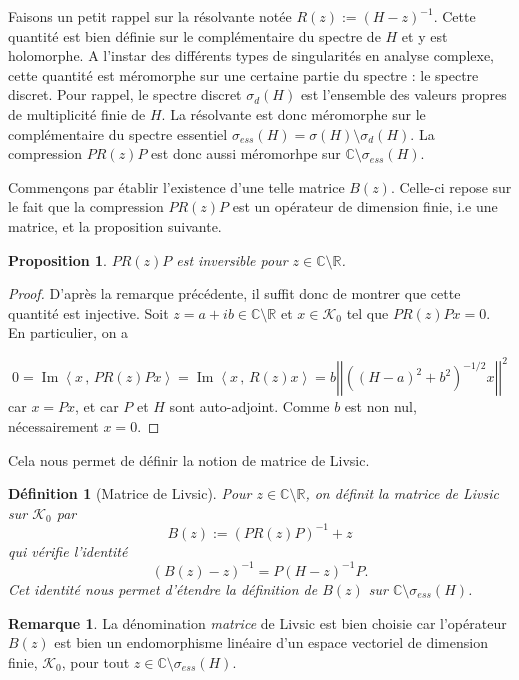 \documentclass[12pt,openany,a4paper, titlepage]{article}
\newcommand{\lp}{\left(}
\newcommand{\rp}{\right)}
\newcommand{\lb}{\left|}
\newcommand{\rb}{\right|}
\newcommand{\la}{\left\langle}
\newcommand{\ra}{\right\rangle}
\newcommand{\R}{\mathbb{R}}
\newcommand{\C}{\mathbb{C}}
\newcommand{\inv}{^{-1}}
\newcommand{\im}{\operatorname{Im}}
\newtheorem{Def}{Définition}
\newtheorem{prop}{Proposition}
\theoremstyle{definition}
\theoremstyle{definition}
\theoremstyle{definition}
\theoremstyle{definition}
\theoremstyle{definition}
\newtheorem{rem}{Remarque}
\theoremstyle{definition}
\begin{document}
Faisons un petit rappel sur la résolvante notée $R(z) := (H-z)\inv$. Cette quantité est bien définie sur le complémentaire du spectre de $H$ et y est holomorphe. A l'instar des différents types de singularités en analyse complexe, cette quantité est méromorphe sur une certaine partie du spectre : le spectre discret. Pour rappel, le spectre discret $\sigma_d(H)$ est l'ensemble des valeurs propres de multiplicité finie de $H$. La résolvante est donc méromorphe sur le complémentaire du spectre essentiel $\sigma_{ess}(H) = \sigma(H)\setminus\sigma_d (H)$. La compression $PR(z)P$ est donc aussi méromorhpe sur  $\C\setminus\sigma_{ess}(H)$.

Commençons par établir l'existence d'une telle matrice $B(z)$. Celle-ci repose sur le fait que la compression $PR(z)P$ est un opérateur de dimension finie, i.e une matrice, et la proposition suivante.

\begin{prop}
    $PR(z)P$ est inversible pour $z\in\C\setminus\R$.
\end{prop}
\begin{proof}
    D'après la remarque précédente, il suffit donc de montrer que cette quantité est injective. Soit $z = a+ib\in\C\setminus\R$ et $x\in \mathcal{K}_0$ tel que $PR(z)Px = 0$. En particulier, on a 

    $$0 = \im\la x\,,\, PR(z)Px \ra = \im\la x\,,\, R(z)x \ra = b\lb\lb\lp (H-a)^2 + b^2 \rp^{-1/2}x\rb\rb^2$$
    car $x = Px$, et car $P$ et $H$ sont auto-adjoint. Comme $b$ est non nul, nécessairement $x = 0$.
\end{proof}

Cela nous permet de définir la notion de matrice de Livsic.

\begin{Def}[Matrice de Livsic]
Pour $z\in \C\setminus\R$, on définit la matrice de Livsic sur $\mathcal{K}_0$ par
\begin{equation*}
    B(z) := (PR(z)P)\inv + z
\end{equation*}
qui vérifie l'identité 
\begin{equation*}
    (B(z)-z)\inv = P(H-z)\inv P.
\end{equation*}
Cet identité nous permet d'étendre la définition de $B(z)$ sur $\C\setminus\sigma_{ess}(H)$.
\end{Def}

\begin{rem}
    La dénomination \textit{matrice} de Livsic est bien choisie car l'opérateur $B(z)$ est bien un endomorphisme linéaire d'un espace vectoriel de dimension finie, $\mathcal{K}_0$, pour tout $z\in\C\setminus\sigma_{ess}(H)$.
\end{rem}
\end{document}
